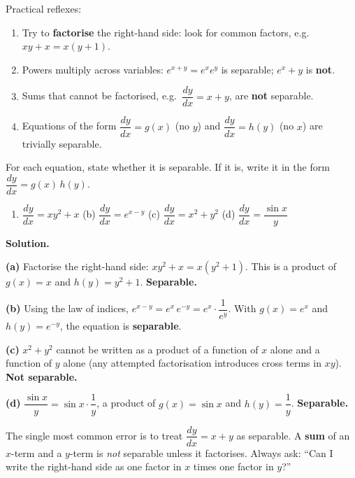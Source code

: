 \documentclass[11pt]{article}
\begin{document}
\begin{methode}
Practical reflexes:
\begin{enumerate}
\item Try to \textbf{factorise} the right-hand side: look for common factors, e.g.\ $xy + x = x(y+1)$.
\item Powers multiply across variables: $e^{x+y} = e^{x}e^{y}$ is separable; $e^{x} + y$ is \textbf{not}.
\item Sums that cannot be factorised, e.g.\ $\dfrac{dy}{dx} = x + y$, are \textbf{not} separable.
\item Equations of the form $\dfrac{dy}{dx} = g(x)$ (no $y$) and $\dfrac{dy}{dx} = h(y)$ (no $x$) are trivially separable.
\end{enumerate}
\end{methode}

\begin{exoresolu}
For each equation, state whether it is separable. If it is, write it in the form $\dfrac{dy}{dx} = g(x)\,h(y)$.
\begin{enumerate}
\item $\dfrac{dy}{dx} = xy^2 + x$ \qquad (b)\; $\dfrac{dy}{dx} = e^{x - y}$ \qquad (c)\; $\dfrac{dy}{dx} = x^2 + y^2$ \qquad (d)\; $\dfrac{dy}{dx} = \dfrac{\sin x}{y}$
\end{enumerate}
\tcblower
\textbf{Solution.}\par
\textbf{(a)} Factorise the right-hand side: $xy^2 + x = x(y^2 + 1)$. This is a product of $g(x) = x$ and $h(y) = y^2 + 1$. \textbf{Separable.}\par
\textbf{(b)} Using the law of indices, $e^{x-y} = e^{x}\,e^{-y} = e^{x}\cdot\dfrac{1}{e^{y}}$. With $g(x) = e^{x}$ and $h(y) = e^{-y}$, the equation is \textbf{separable}.\par
\textbf{(c)} $x^2 + y^2$ cannot be written as a product of a function of $x$ alone and a function of $y$ alone (any attempted factorisation introduces cross terms in $xy$). \textbf{Not separable.}\par
\textbf{(d)} $\dfrac{\sin x}{y} = \sin x \cdot \dfrac{1}{y}$, a product of $g(x) = \sin x$ and $h(y) = \dfrac{1}{y}$. \textbf{Separable.}
\end{exoresolu}

\begin{attention}
The single most common error is to treat $\dfrac{dy}{dx} = x + y$ as separable. A \textbf{sum} of an $x$-term and a $y$-term is \emph{not} separable unless it factorises. Always ask: ``Can I write the right-hand side as one factor in $x$ times one factor in $y$?''
\end{attention}
\end{document}
